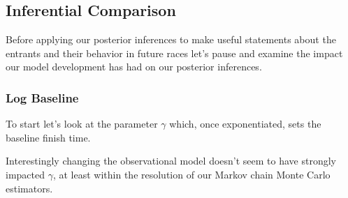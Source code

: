 \documentclass[
  letterpaper,
  DIV=11,
  numbers=noendperiod]{scrartcl}
\newenvironment{Shaded}{\begin{snugshade}}{\end{snugshade}}
\newcommand{\AttributeTok}[1]{\textcolor[rgb]{0.40,0.45,0.13}{#1}}
\newcommand{\ConstantTok}[1]{\textcolor[rgb]{0.56,0.35,0.01}{#1}}
\newcommand{\DecValTok}[1]{\textcolor[rgb]{0.68,0.00,0.00}{#1}}
\newcommand{\FloatTok}[1]{\textcolor[rgb]{0.68,0.00,0.00}{#1}}
\newcommand{\FunctionTok}[1]{\textcolor[rgb]{0.28,0.35,0.67}{#1}}
\newcommand{\NormalTok}[1]{\textcolor[rgb]{0.00,0.23,0.31}{#1}}
\newcommand{\SpecialCharTok}[1]{\textcolor[rgb]{0.37,0.37,0.37}{#1}}
\newcommand{\StringTok}[1]{\textcolor[rgb]{0.13,0.47,0.30}{#1}}
\begin{document}
\subsection{Inferential Comparison}\label{sec:inf-comp}

Before applying our posterior inferences to make useful statements about
the entrants and their behavior in future races let's pause and examine
the impact our model development has had on our posterior inferences.

\subsubsection{Log Baseline}\label{log-baseline}

To start let's look at the parameter \(\gamma\) which, once
exponentiated, sets the baseline finish time.

Interestingly changing the observational model doesn't seem to have
strongly impacted \(\gamma\), at least within the resolution of our
Markov chain Monte Carlo estimators.

\begin{Shaded}
\end{Shaded}
\end{document}
